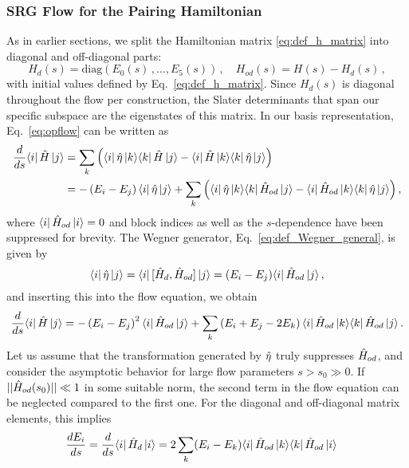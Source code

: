 {%
%
\subsubsection{\label{sec:srg_pairing_flow}SRG Flow for the Pairing Hamiltonian}
As in earlier sections, we split the Hamiltonian matrix \eqref{eq:def_h_matrix}
into diagonal and off-diagonal parts:
\begin{equation}
  H_d(s) = \mathrm{diag}(E_0(s)\,,\ldots,E_5(s))\,,\quad H_{od}(s) = H(s) - H_{d}(s)\,,
\end{equation}
with initial values defined by Eq.~\eqref{eq:def_h_matrix}. Since $H_d(s)$
is diagonal throughout the flow per construction, the Slater determinants
that span our specific subspace are the eigenstates of this matrix. In our 
basis representation, Eq.~\eqref{eq:opflow} can be written as
\begin{align}
   \frac{d {}} {d {s}} \langle{i}|\,{\hat{H}}\,|{j}\rangle
  &=\sum_k\left(\langle{i}|\,{\hat{\eta}}\,|{k}\rangle\langle{k}|\,{\hat{H}}\,|{j}\rangle-\langle{i}|\,{\hat{H}}\,|{k}\rangle\langle{k}|\,{\hat{\eta}}\,|{j}\rangle\right)\notag\\
  &=-\left(E_i-E_j\right)\langle{i}|\,{\hat{\eta}}\,|{j}\rangle
    +\sum_k\left(\langle{i}|\,{\hat{\eta}}\,|{k}\rangle\langle{k}|\,{\hat{H}_{od}}\,|{j}\rangle-\langle{i}|\,{\hat{H}_{od}}\,|{k}\rangle\langle{k}|\,{\hat{\eta}}\,|{j}\rangle\right),
\end{align}
where $\langle{i}|\,{\hat{H}_{od}}\,|{i}\rangle=0$ and block indices as well as the $s$-dependence
have been suppressed for brevity. The Wegner generator, Eq.~\eqref{eq:def_Wegner_general}, 
is given by
\begin{equation}
  \langle{i}|\,{\hat{\eta}}\,|{j}\rangle=\langle{i}|\,{[{\hat{H}_d},{\hat{H}_{od}}]}\,|{j}\rangle=(E_i-E_j)\langle{i}|\,{\hat{H}_{od}}\,|{j}\rangle\,,
\end{equation}
and inserting this into the flow equation, we obtain
\begin{align}
  \totd{}{s}\matrixe{i}{\HO}{j}
  =-\left(E_i-E_j\right)^2\matrixe{i}{\HO_{od}}{j}
  +\sum_k\left(E_i+E_j-2E_k\right)\matrixe{i}{\HO_{od}}{k}\matrixe{k}{\HO_{od}}{j}\,.\label{eq:schema_wegner}
\end{align}
Let us assume that the transformation generated by $\hat{\eta}$ truly suppresses 
$\hat{H}_{od}$, and consider the asymptotic behavior for large flow parameters 
$s>s_0\gg0$. If $||\hat{H}_{od}(s_0)||\ll 1$ in some suitable norm, the second 
term in the flow equation can be neglected compared to the first one. For
the diagonal and off-diagonal matrix elements, this implies
\begin{align}
  \totd{E_i}{s} &= \totd{}{s} \matrixe{i}{\HO_d}{i} = 2\sum_k (E_i - E_k) \matrixe{i}{\HO_{od}}{k}\matrixe{k}{\HO_{od}}{i}

\end{align}}
